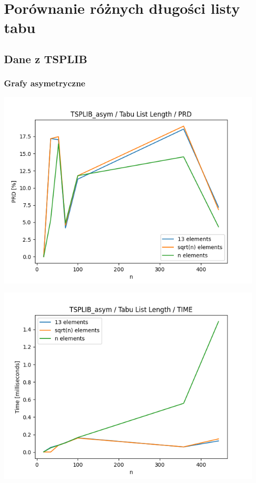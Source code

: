\documentclass{article}
\begin{document}
\section{Porównanie różnych długości listy tabu}

\subsection{Dane z TSPLIB}

\subsubsection{Grafy asymetryczne}

\begin{center}
\includegraphics[width=\textwidth, 
                   height = 0.4\textheight, 
                   keepaspectratio]
                  {plots/tabu_tsplib_asym_prd} 
\end{center}

\begin{center}
\includegraphics[width=\textwidth, 
                   height = 0.4\textheight, 
                   keepaspectratio]
                  {plots/tabu_tsplib_asym_time} 
\end{center}
\end{document}

